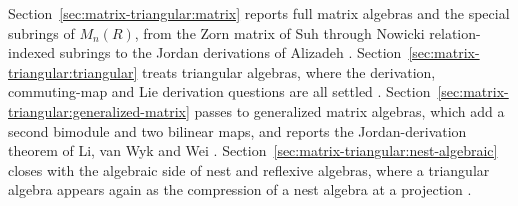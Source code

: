 Section~\ref{sec:matrix-triangular:matrix} reports full matrix algebras and the
special subrings of $M_n(R)$, from the Zorn matrix of Suh through Nowicki
relation-indexed subrings to the Jordan derivations of Alizadeh
\cite[Theorem~3.1, p.~575]{Alizadeh2009}.
Section~\ref{sec:matrix-triangular:triangular} treats triangular algebras, where
the derivation, commuting-map and Lie derivation questions are all settled
\cite[Theorem~11, p.~307]{Cheung2003}.
Section~\ref{sec:matrix-triangular:generalized-matrix} passes to generalized
matrix algebras, which add a second bimodule and two bilinear maps, and reports
the Jordan-derivation theorem of Li, van Wyk and Wei
\cite[Theorem~3.11, p.~13]{LiVanWykWei2012}.
Section~\ref{sec:matrix-triangular:nest-algebraic} closes with the algebraic
side of nest and reflexive algebras, where a triangular algebra appears again as the
compression of a nest algebra at a projection
\cite[Proposition~19, p.~308]{Cheung2003}.

